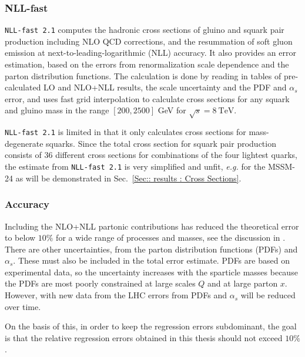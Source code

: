 \documentclass[twoside,english]{uiofysmaster}
\begin{document}
{{\subsubsection{NLL-fast}

\verb|NLL-fast 2.1| \cite{beenakker1997squark, kulesza2009threshold, kulesza2009soft, beenakker2009soft, beenakker2011squark} computes the hadronic cross sections of gluino and squark pair production including NLO QCD corrections, and the resummation of soft gluon emission at next-to-leading-logarithmic (NLL) accuracy. It also provides an error estimation, based on the errors from renormalization scale dependence and the parton distribution functions. The calculation is done by reading in tables of pre-calculated LO and NLO+NLL results, the scale uncertainty and the PDF and $\alpha_s$ error, and uses fast grid interpolation to calculate cross sections for any squark and gluino mass in the range $[200, 2500]$ GeV for $\sqrt{s}=8~\mathrm{TeV}$. 

\verb|NLL-fast 2.1| is limited in that it only calculates cross sections for mass-degenerate squarks. Since the total cross section for squark pair production consists of 36 different cross sections for combinations of the four lightest quarks, the estimate from \verb|NLL-fast 2.1| is very simplified and unfit, \textit{e.g.} for the MSSM-24 as will be demonstrated in Sec.~\ref{Sec:: results : Cross Sections}.

\subsubsection{Accuracy}

Including the NLO+NLL partonic contributions has reduced the theoretical error to below $10 \%$ for a wide range of processes and masses, see the discussion in \cite{balazs2017colliderbit}. There are other uncertainties, from the parton distribution functions (PDFs) and $\alpha_s$. These must also be included in the total error estimate. PDFs are based on experimental data, so the uncertainty increases with the sparticle masses because the PDFs are most poorly constrained at large scales $Q$ and at large parton $x$. However, with new data from the LHC errors from PDFs and $\alpha_s$ will be reduced over time.

On the basis of this, in order to keep the regression errors subdominant, the goal is that the relative regression errors obtained in this thesis should not exceed $10 \%$.







}}
\end{document}

